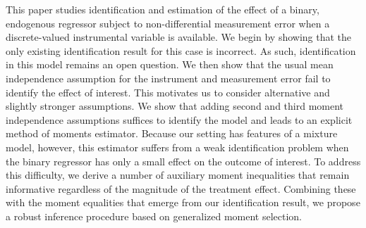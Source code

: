 This paper studies identification and estimation of the effect of a binary, endogenous regressor subject to non-differential measurement error when a discrete-valued instrumental variable is available. 
We begin by showing that the only existing identification result for this case is incorrect. 
As such, identification in this model remains an open question. 
We then show that the usual mean independence assumption for the instrument and measurement error fail to identify the effect of interest. 
This motivates us to consider alternative and slightly stronger assumptions. 
We show that adding second and third moment independence assumptions suffices to identify the model and leads to an explicit method of moments estimator. 
Because our setting has features of a mixture model, however, this estimator suffers from a weak identification problem when the binary regressor has only a small effect on the outcome of interest. 
To address this difficulty, we derive a number of auxiliary moment inequalities that remain informative regardless of the magnitude of the treatment effect. 
Combining these with the moment equalities that emerge from our identification result, we propose a robust inference procedure based on generalized moment selection.

